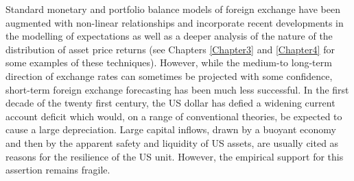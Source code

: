 \documentclass[12pt, a4paper, oneside]{article}\usepackage[]{graphicx}\usepackage[]{color}
\begin{document}
Standard monetary and portfolio balance models of foreign exchange have been augmented with non-linear relationships and incorporate recent developments in the modelling of expectations as well as a deeper analysis of the nature of the distribution of asset price returns (see Chapters \ref{Chapter3} and \ref{Chapter4} for some examples of these techniques).  However, while the medium-to long-term direction of exchange rates can sometimes be projected with some confidence, short-term foreign exchange forecasting has been much less successful.  In the first decade of the twenty first century, the US dollar has defied a widening current account deficit which would, on a range of conventional theories,  be expected to cause a large depreciation.  Large capital inflows, drawn by a buoyant economy and then by the apparent safety and liquidity of US assets,  are usually cited as reasons for the resilience of the US unit.  However, the empirical support for this assertion remains fragile. 
 
\end{document}
